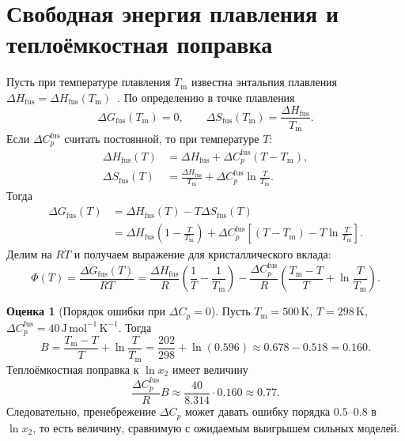 \documentclass[11pt]{article}
\newcommand{\Tm}{T_{\mathrm m}}
\newcommand{\dHfus}{\Delta H_{\mathrm{fus}}}
\newcommand{\dCpfus}{\Delta C_p^{\mathrm{fus}}}
\theoremstyle{definition}
\newtheorem{estimate}{Оценка}[section]
\begin{document}
\section{Свободная энергия плавления и теплоёмкостная поправка}
\label{app:fusion}

Пусть при температуре плавления $\Tm$ известна энтальпия плавления $\dHfus=\Delta H_{\mathrm{fus}}(\Tm)$~\cite{acree2010,yalkowsky1979}. По определению в точке плавления
\begin{equation*}
    \Delta G_{\mathrm{fus}}(\Tm)=0,
    \qquad
    \Delta S_{\mathrm{fus}}(\Tm)=\frac{\dHfus}{\Tm}.
\end{equation*}
Если $\dCpfus$ считать постоянной, то при температуре $T$:
\begin{align*}
    \Delta H_{\mathrm{fus}}(T)
    &= \dHfus + \dCpfus(T-\Tm), \\
    \Delta S_{\mathrm{fus}}(T)
    &= \frac{\dHfus}{\Tm}+\dCpfus\ln\frac{T}{\Tm}.
\end{align*}
Тогда
\begin{align*}
    \Delta G_{\mathrm{fus}}(T)
    &= \Delta H_{\mathrm{fus}}(T)-T\Delta S_{\mathrm{fus}}(T) \\
    &= \dHfus\left(1-\frac{T}{\Tm}\right)
       +\dCpfus\left[(T-\Tm)-T\ln\frac{T}{\Tm}\right].
\end{align*}
Делим на $RT$ и получаем выражение для кристаллического вклада:
\begin{equation}
    \Phi(T)=\frac{\Delta G_{\mathrm{fus}}(T)}{RT}
    =\frac{\dHfus}{R}\left(\frac{1}{T}-\frac{1}{\Tm}\right)
    -\frac{\dCpfus}{R}\left(\frac{\Tm-T}{T}+\ln\frac{T}{\Tm}\right).
    \label{eq:phi-dcp}
\end{equation}

\begin{estimate}[Порядок ошибки при $\Delta C_p=0$]
Пусть $\Tm=500\,\mathrm{K}$, $T=298\,\mathrm{K}$, $\dCpfus=40\,\mathrm{J\,mol^{-1}\,K^{-1}}$. Тогда
\begin{equation*}
    B=\frac{\Tm-T}{T}+\ln\frac{T}{\Tm}
    =\frac{202}{298}+\ln(0.596)\approx 0.678-0.518=0.160.
\end{equation*}
Теплоёмкостная поправка к $\ln x_2$ имеет величину
\begin{equation*}
    \frac{\dCpfus}{R}B\approx \frac{40}{8.314}\cdot 0.160\approx 0.77.
\end{equation*}
Следовательно, пренебрежение $\Delta C_p$ может давать ошибку порядка $0.5$--$0.8$ в $\ln x_2$, то есть величину, сравнимую с ожидаемым выигрышем сильных моделей.
\end{estimate}
\end{document}
